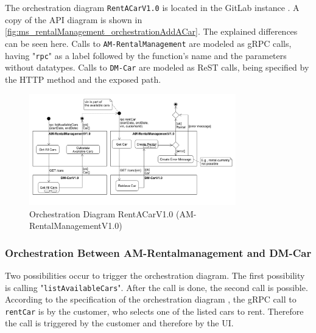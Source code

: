 The orchestration diagram \texttt{RentACarV1.0} is located in the GitLab instance \cite{CM-G-ORC}.
A copy of the API diagram is shown in \autoref{fig:ms_rentalManagement_orchestrationAddACar}.
The explained differences can be seen here.
Calls to \texttt{AM-RentalManagement} are modeled as gRPC calls, having "\texttt{rpc}" as a label followed by the function's name and the parameters without datatypes.
Calls to \texttt{DM-Car} are modeled as ReST calls, being specified by the HTTP method and the exposed path.

\begin{figure}
    \centering
    \includegraphics[width=0.8\textwidth]{figures/microservices/rentalManagement/ms_rentalManagement_orchestrationAddACar.png}
    \caption{Orchestration Diagram RentACarV1.0 (AM-RentalManagementV1.0)}
    \label{fig:ms_rentalManagement_orchestrationAddACar}
\end{figure}

\subsubsection*{Orchestration Between AM-Rentalmanagement and DM-Car}
Two possibilities occur to trigger the orchestration diagram.
The first possibility is calling "\texttt{listAvailableCars}".
After the call is done, the second call is possible.
According to the specification of the orchestration diagram \cite{CM-G-ORC}, the gRPC call to \texttt{rentCar} is by the customer, who selects one of the listed cars to rent.
Therefore the call is triggered by the customer and therefore by the UI.

